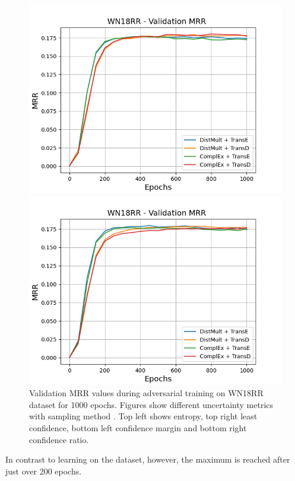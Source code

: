 \begin{figure}
\begin{minipage}{.5\textwidth}
    \end{minipage}
    \begin{minipage}{.5\textwidth}
      \centering
      \includegraphics[width=0.9\linewidth]{figures/results/gan_train/not_pretrained/uncertainty/max_distribution/confidence_margin/wn18rr/uncertainty_wn18rr_mrrs.png}
    \end{minipage}%
    \begin{minipage}{.5\textwidth}
      \centering
      \includegraphics[width=0.9\linewidth]{figures/results/gan_train/not_pretrained/uncertainty/max_distribution/confidence_ratio/wn18rr/uncertainty_wn18rr_mrrs.png}
    \end{minipage}%
    \caption{Validation MRR values during adversarial training on \textsc{WN18RR} dataset for 1000 epochs. 
    Figures show different uncertainty metrics with sampling method  \ussoftmax.
    Top left shows entropy, top right least confidence, 
    bottom left confidence margin and bottom right confidence ratio.}
    \label{fig:advtrain_metrics_wn18rr}
\end{figure}
In contrast to learning on the \umls dataset, however, the maximum is reached after just over 200 epochs.

